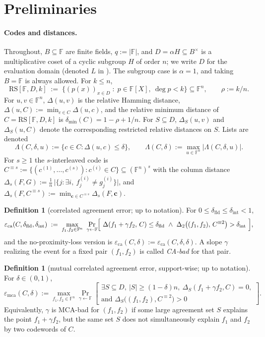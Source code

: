 \documentclass[11pt]{article}
\theoremstyle{definition}
\newtheorem{definition}[theorem]{Definition}
\theoremstyle{remark}
\newcommand{\F}{\mathbb{F}}
\newcommand{\B}{B}
\newcommand{\RS}{\mathrm{RS}}
\newcommand{\eca}{\varepsilon_{\mathrm{ca}}}
\newcommand{\emca}{\varepsilon_{\mathrm{mca}}}
\newcommand{\dmin}{\delta_{\min}}
\newcommand{\dist}{\Delta}
\newcommand{\distS}{\Delta_S}
\newcommand{\Lst}{\Lambda}
\begin{document}
\section{Preliminaries}\label{sec:prelim}

\paragraph{Codes and distances.} Throughout, $\B\subseteq\F$ are finite fields, $q:=|\F|$, and $D=\alpha H\subseteq\B^\times$ is a multiplicative coset of a cyclic subgroup $H$ of order $n$; we write $D$ for the evaluation domain (denoted $L$ in \cite{ABF26}). The subgroup case is $\alpha=1$, and taking $\B=\F$ is always allowed. For $k\le n$,
\[
\RS[\F,D,k]\;:=\;\bigl\{(p(x))_{x\in D}\;:\;p\in\F[X],\ \deg p<k\bigr\}\subseteq\F^n,
\qquad \rho:=k/n .
\]
For $u,v\in\F^n$, $\dist(u,v)$ is the relative Hamming distance, $\dist(u,C):=\min_{c\in C}\dist(u,c)$, and the relative minimum distance of $C=\RS[\F,D,k]$ is $\dmin(C)=1-\rho+1/n$. For $S\subseteq D$, $\distS(u,v)$ and $\distS(u,C)$ denote the corresponding restricted relative distances on $S$. Lists are denoted
\[
\Lst(C,\delta,u):=\{c\in C:\dist(u,c)\le\delta\},\qquad \Lst(C,\delta):=\max_{u\in\F^n}|\Lst(C,\delta,u)| .
\]
For $s\ge1$ the $s$-interleaved code is $C^{\equiv s}:=\{(c^{(1)},\dots,c^{(s)}):c^{(i)}\in C\}\subseteq(\F^n)^s$ with the column distance $\dist_s(F,G):=\frac1n\,\bigl|\{j:\exists i,\ f^{(i)}_j\ne g^{(i)}_j\}\bigr|$, and $\dist_s(F,C^{\equiv s}):=\min_{\mathbf c\in C^{\equiv s}}\dist_s(F,\mathbf c)$.

\begin{definition}[correlated agreement error; {\cite[Def.~4.1]{ABF26}} up to notation]\label{def:ca}
For $0\le\delta_{\mathrm{fld}}\le\delta_{\mathrm{int}}<1$,
\[
\eca(C,\delta_{\mathrm{fld}},\delta_{\mathrm{int}})\;:=\;\max_{f_1,f_2\in\F^n}\ \Pr_{\gamma\leftarrow\F}\Bigl[\ \dist(f_1+\gamma f_2,\,C)\le\delta_{\mathrm{fld}}\ \wedge\ \dist_2\bigl((f_1,f_2),\,C^{\equiv2}\bigr)>\delta_{\mathrm{int}}\ \Bigr],
\]
and the no-proximity-loss version is $\eca(C,\delta):=\eca(C,\delta,\delta)$. A slope $\gamma$ realizing the event for a fixed pair $(f_1,f_2)$ is called \emph{CA-bad} for that pair.
\end{definition}

\begin{definition}[mutual correlated agreement error, support-wise; {\cite[Def.~4.3]{ABF26}} up to notation]\label{def:mca}
For $\delta\in(0,1)$,
\[
\emca(C,\delta):=\max_{f_1,f_2\in\F^n}\Pr_{\gamma\leftarrow\F}\left[
\begin{array}{l}
\exists S\subseteq D,\ |S|\ge(1-\delta)n,\ \distS(f_1+\gamma f_2,C)=0,\\[2pt]
\text{and }\distS\bigl((f_1,f_2),C^{\equiv2}\bigr)>0
\end{array}
\right].
\]
Equivalently, $\gamma$ is MCA-bad for $(f_1,f_2)$ if some large agreement set $S$ explains the point $f_1+\gamma f_2$, but the same set $S$ does not simultaneously explain $f_1$ and $f_2$ by two codewords of $C$.
\end{definition}
\end{document}
